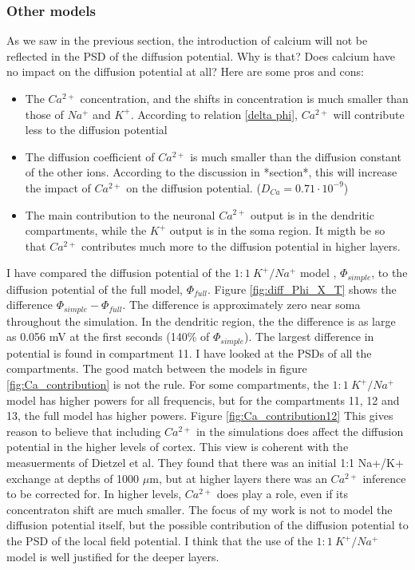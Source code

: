 \documentclass{article}
\begin{document}
\subsubsection{Other models}
As we saw in the previous section, the introduction of calcium will not be reflected in the PSD of the diffusion potential. Why is that? Does calcium have no impact on the diffusion potential at all? Here are some pros and cons:
\begin{itemize}
	\item
The $Ca^{2+}$ concentration, and the shifts in concentration is much smaller than those of $Na^+$ and $K^+$. According to relation \ref{delta phi}, $Ca^{2+}$ will contribute less to the diffusion potential
	\item The diffusion coefficient of $Ca^{2+}$ is much smaller than the diffusion constant of the other ions. According to the discussion in *section*, this will increase the impact of $Ca^{2+} $ on the diffusion potential. ($D_{Ca} = 0.71\cdot 10^{-9}$)
	\item The main contribution to the neuronal $Ca^{2+}$ output is in the dendritic compartments, while the $K^+$ output is in the soma region. It migth be so that $Ca^{2+}$ contributes much  more to the diffusion potential in higher layers.
\end{itemize}
I have compared the diffusion potential of the $1\!:\!1\ K^+\!/Na^+$ model , $\Phi_{simple}$,  to the diffusion potential of the full model, $\Phi_{full}$. Figure \ref{fig:diff_Phi_X_T} shows the difference $\Phi_{simple}-\Phi_{full}$. The difference is approximately zero near soma throughout the simulation. In the dendritic region, the the difference is as large as 0.056 mV at the first seconds (140\% of $\Phi_{simple}$). The largest difference in potential is found in compartment 11. I have looked at the PSDs of all the compartments. The good match between the models in figure \ref{fig:Ca_contribution} is not the rule. For some compartments, the $1\!:\!1\ K^+\!/Na^+$ model has higher powers for all frequencis, but for the compartments 11, 12 and 13, the full model has higher powers. Figure \ref{fig:Ca_contribution12} This gives reason to believe that including $Ca^{2+}$ in the simulations does affect the diffusion potential in the higher levels of cortex. This view is coherent with the measuerments of Dietzel et al. They found that there was an initial 1:1 Na+/K+ exchange at depths of 1000 $\mu$m, but at higher layers there was an $Ca^{2+}$ inference to be corrected for. In higher levels, $Ca^{2+}$ does play a role, even if its concentraton shift are much smaller.  The focus of my work is not to model the diffusion potential itself, but the possible contribution of the diffusion potential to the PSD of the local field potential. I think that the use of the $1\!:\!1\ K^+\!/Na^+$ model is well justified for the deeper layers. 
 
\end{document}
